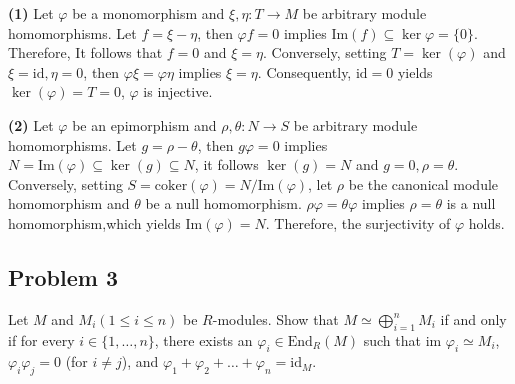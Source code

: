 \begin{solution}
\textbf{(1)} Let $\varphi$ be a monomorphism and $\xi,\eta:T\to M$ be arbitrary module homomorphisms. Let $f=\xi-\eta$, then $\varphi f=0$ implies $\text{Im}(f)\subseteq \ker{\varphi} = \{0\}$. Therefore, It follows that $f=0$ and $\xi=\eta$.
Conversely, setting $T = \ker(\varphi)$ and $\xi=\text{id},\eta=0$, then $\varphi\xi = \varphi\eta$ implies $\xi=\eta$. Consequently, $\text{id}=0$ yields $\ker(\varphi)=T=0$, $\varphi$ is injective.

\textbf{(2)} Let $\varphi$ be an epimorphism and $\rho,\theta:N\to S$ be arbitrary module homomorphisms. Let $g=\rho-\theta$, then $g\varphi =0$ implies $N=\text{Im}(\varphi)\subseteq \ker(g)\subseteq N$, it follows $\ker(g)=N$ and $g=0,\rho=\theta$.
Conversely, setting $S=\text{coker}(\varphi)=  N/\text{Im}(\varphi)$, let $\rho$ be the canonical module homomorphism and $\theta$ be a null homomorphism. $\rho\varphi = \theta\varphi$ implies $\rho = \theta$ is a null homomorphism,which yields $\text{Im}(\varphi) = N$.
Therefore, the surjectivity of $\varphi$ holds. 
\end{solution}

\subsection*{Problem 3}
Let $M$ and $M_i(1 \le i \le n)$ be $R$-modules. Show that $M \simeq \bigoplus_{i=1}^n M_i$ if and only if for every $i \in \{1, \dots, n\}$, there exists an $\varphi_i \in \text{End}_R(M)$ such that $\text{im } \varphi_i \simeq M_i$, $\varphi_i\varphi_j = 0$ (for $i \neq j$), and $\varphi_1 + \varphi_2 + \dots + \varphi_n = \text{id}_M$.

